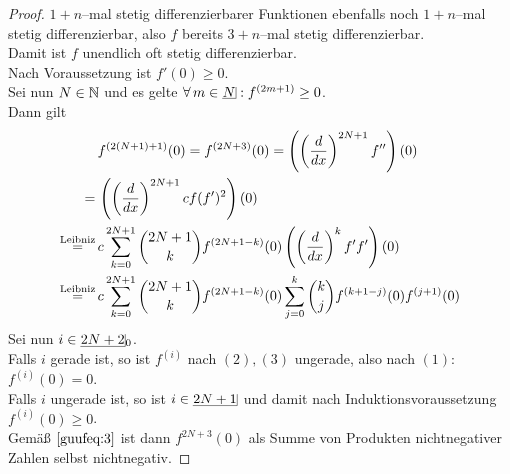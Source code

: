 \begin{proof}
$1+n$--mal stetig differenzierbarer Funktionen ebenfalls noch $1+n$--mal stetig
differenzierbar, also $f$ bereits $3+n$--mal stetig differenzierbar.\\
Damit ist $f$ unendlich oft stetig differenzierbar.\\
Nach Voraussetzung ist $f'(0) \ge 0$.\\
Sei nun $N \in \mathbb{N}$ und es gelte $\forall\, m \in \haken N: f^{(2m+1)}\ge 0$.\\
Dann gilt
\begin{align}
&\,f^{(2(N+1)+1)}(0) = f^{(2N+3)}(0) = 
\left(\left(\frac d {dx} \right)^{2N+1}f'' \right)(0)\notag\\
=&\, \left(\left(\frac d {dx} \right)^{2N+1} c f (f')^2\right) (0)\notag\\
\overset{\text{Leibniz}}=&\, c\sum_{k=0}^{2N+1}\binom{2N+1}k f^{(2N+1-k)}(0) 
\left(\left(\frac d {dx} \right)^{k}f'f' \right)(0)\notag\\
\overset{\text{Leibniz}}=&\,c\sum_{k=0}^{2N+1}\binom{2N+1}k f^{(2N+1-k)}(0)
\sum_{j=0}^k\binom k j f^{(k+1-j)}(0)f^{(j+1)}(0) \label{guufeq:3}
\end{align}
Sei nun $i \in \haken {2N+2}_0$.\\
Falls $i$ gerade ist, so ist $f^{(i)}$ nach $(2),(3)$ ungerade, also nach
$(1)$: $f^{(i)}(0) = 0$.\\
Falls $i$ ungerade ist, so ist $i \in \haken{2N+1}$ und damit nach
Induktionsvoraussetzung $f^{(i)}(0) \ge 0$.\\
Gemäß $\eqref{guufeq:3}$ ist dann $f^{2N+3}(0)$ als Summe von Produkten
nichtnegativer Zahlen selbst nichtnegativ.
\end{proof}